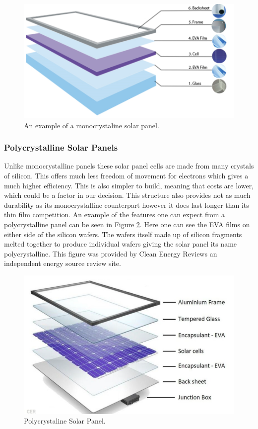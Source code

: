 \begin{figure}
    \centering
    \includegraphics[scale=0.5]{figures/monocrystaline.png}
    \caption{An example of a monocrystaline solar panel.}
    \label{fig:mono-sp} 
\end{figure}
\subsubsection{Polycrystalline Solar Panels}

Unlike monocrystalline panels these solar panel cells are made from many crystals of silicon. This offers much less freedom of movement for electrons which gives a much higher efficiency. This is also simpler to build, meaning that costs are lower, which could be a factor in our decision. This structure also provides not as much durability as its monocrystalline counterpart however it does last longer than its thin film competition. An example of the features one can expect from a polycrystalline panel can be seen in Figure \ref{fig:poly-sp}. Here one can see the EVA films on either side of the silicon wafers. The wafers itself made up of silicon fragments melted together to produce individual wafers giving the solar panel its name polycrystalline. This figure was provided by Clean Energy Reviews an independent energy source review site.

\begin{figure}
    \centering
    \includegraphics[scale=0.4]{figures/polycrystaline solar.png}
    \caption{Polycrystaline Solar Panel.}
    \label{fig:poly-sp} 
\end{figure}
